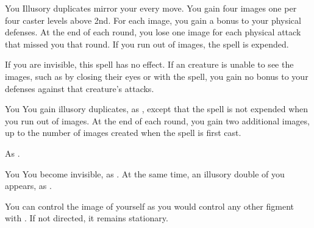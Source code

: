 \begin{spellheader}
\end{spellheader}
\begin{spelleffects}
    \begin{spelltarget}{You}
        \spelleffect Illusory duplicates mirror your every move. You gain four images \add one per four caster levels above 2nd. For each image, you gain a  bonus to your physical defenses. At the end of each round, you lose one image for each physical attack that missed you that round. If you run out of images, the spell is expended.
    \end{spelltarget}
\end{spelleffects}
\begin{spellfooter}
    \spellnotes If you are invisible, this spell has no effect. If an creature is unable to see the images, such as by closing their eyes or with the  spell, you gain no bonus to your defenses against that creature's attacks.
\end{spellfooter}

\begin{spellheader}
    \spelldur{\durshort \dismissable}
\end{spellheader}
\begin{spelleffects}
    \begin{spelltarget}{You}
        \spelleffect You gain illusory duplicates, as , except that the spell is not expended when you run out of images. At the end of each round, you gain two additional images, up to the number of images created when the spell is first cast.
    \end{spelltarget}
\end{spelleffects}
\begin{spellfooter}
    \spellnotes As .
\end{spellfooter}

\begin{spellheader}
    \spelldur{\durshort \dismissable}
\end{spellheader}
\begin{spelleffects}
    \begin{spelltarget}{You}
        \spelleffect You become invisible, as . At the same time, an illusory double of you appears, as .

        You can control the image of yourself as you would control any other figment with . If not directed, it remains stationary.
    \end{spelltarget}
\end{spelleffects}
\begin{spellfooter}
    
\end{spellfooter}

